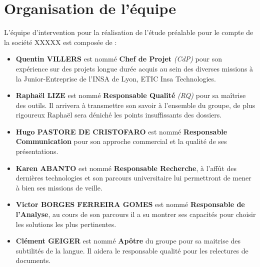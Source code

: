 \section{Organisation de l'équipe}

L'équipe d'intervention pour la réalisation de l'étude préalable pour le compte de la société XXXXX est composée de : 

\begin{itemize}
\item {\bf Quentin VILLERS} est nommé {\bf Chef de Projet} {\it (CdP)} pour son expérience sur des projets longue durée acquis au sein des diverses missions à la Junior-Entreprise de l'INSA de Lyon, ETIC Insa Technologies.
\item {\bf Raphaël LIZE} est nommé {\bf Responsable Qualité} {\it (RQ)} pour sa maîtrise des outils. Il arrivera à transmettre son savoir à l'ensemble du groupe, de plus rigoureux Raphaël sera déniché les points insuffissants des dossiers. 
\item {\bf Hugo PASTORE DE CRISTOFARO} est nommé {\bf Responsable Communication} pour son approche commercial et la qualité de ses présentations. 
\item {\bf Karen ABANTO} est nommé {\bf Responsable Recherche}, à l'affût des dernières technologies et son parcours universitaire lui permettront de mener à bien ses missions de veille.
\item {\bf Victor BORGES FERREIRA GOMES} est nommé {\bf Responsable de l'Analyse}, au cours de son parcours il a su montrer ses capacités pour choisir les solutions les plus pertinentes.
\item {\bf Clément GEIGER} est nommé {\bf Apôtre} du groupe pour sa maitrise des subtilités de la langue. Il aidera le responsable qualité pour les relectures de documents.  
\end{itemize}
